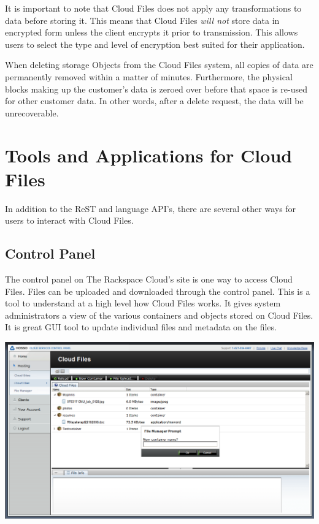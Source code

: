 \documentclass[letterpaper,10pt,english]{manual}
\begin{document}
It is important to note that Cloud Files does not apply any transformations
to data before storing it. This means that Cloud Files \emph{will not} store data
in encrypted form unless the client encrypts it prior to transmission. This
allows users to select the type and level of encryption best suited for
their application.

When deleting storage Objects from the Cloud Files system, all copies of
data are permanently removed within a matter of minutes.  Furthermore,
the physical blocks making up the customer’s data is zeroed over before
that space is re-used for other customer data. In other words, after a
delete request, the data will be unrecoverable.


\chapter{Tools and Applications for Cloud Files}

In addition to the ReST and language API's, there are several other ways
for users to interact with Cloud Files.


\section{Control Panel}

The control panel on The Rackspace Cloud’s site is one way to access Cloud
Files. Files can be uploaded and downloaded through the control panel.
This is a tool to understand at a high level how Cloud Files works.  It
gives system administrators a view of the various containers and objects
stored on Cloud Files. It is great GUI tool to update individual files and
metadata on the files.

{\hfill\includegraphics{cp.png}\hfill}
\end{document}
